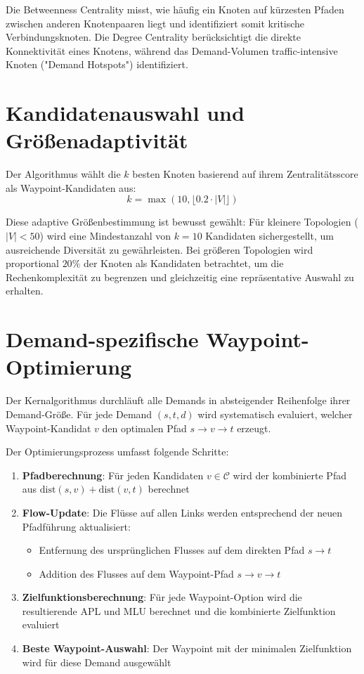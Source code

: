 Die Betweenness Centrality misst, wie häufig ein Knoten auf kürzesten Pfaden zwischen anderen Knotenpaaren liegt und identifiziert somit kritische Verbindungsknoten. Die Degree Centrality berücksichtigt die direkte Konnektivität eines Knotens, während das Demand-Volumen traffic-intensive Knoten ("Demand Hotspots") identifiziert.

\section{Kandidatenauswahl und Größenadaptivität}

Der Algorithmus wählt die $k$ besten Knoten basierend auf ihrem Zentralitätsscore als Waypoint-Kandidaten aus:
\[
  k = \max(10, \lfloor 0.2 \cdot |V| \rfloor)
\]

Diese adaptive Größenbestimmung ist bewusst gewählt: Für kleinere Topologien ($|V| < 50$) wird eine Mindestanzahl von $k = 10$ Kandidaten sichergestellt, um ausreichende Diversität zu gewährleisten. Bei größeren Topologien wird proportional $20\%$ der Knoten als Kandidaten betrachtet, um die Rechenkomplexität zu begrenzen und gleichzeitig eine repräsentative Auswahl zu erhalten.

\section{Demand-spezifische Waypoint-Optimierung}

Der Kernalgorithmus durchläuft alle Demands in absteigender Reihenfolge ihrer Demand-Größe. Für jede Demand $(s,t,d)$ wird systematisch evaluiert, welcher Waypoint-Kandidat $v$ den optimalen Pfad $s \rightarrow v \rightarrow t$ erzeugt.

Der Optimierungsprozess umfasst folgende Schritte:

\begin{enumerate}
    \item \textbf{Pfadberechnung}: Für jeden Kandidaten $v \in \mathcal{C}$ wird der kombinierte Pfad aus $\text{dist}(s,v) + \text{dist}(v,t)$ berechnet
    \item \textbf{Flow-Update}: Die Flüsse auf allen Links werden entsprechend der neuen Pfadführung aktualisiert:
    \begin{itemize}
        \item Entfernung des ursprünglichen Flusses auf dem direkten Pfad $s \rightarrow t$
        \item Addition des Flusses auf dem Waypoint-Pfad $s \rightarrow v \rightarrow t$
    \end{itemize}
    \item \textbf{Zielfunktionsberechnung}: Für jede Waypoint-Option wird die resultierende APL und MLU berechnet und die kombinierte Zielfunktion evaluiert
    \item \textbf{Beste Waypoint-Auswahl}: Der Waypoint mit der minimalen Zielfunktion wird für diese Demand ausgewählt
\end{enumerate}

